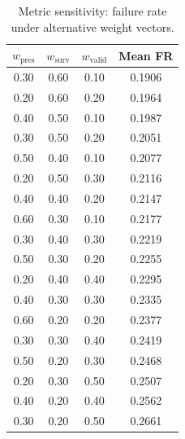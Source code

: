 \begin{table}[t]
\centering
\caption{Metric sensitivity: failure rate under alternative weight vectors.}
\label{tab:metric_sensitivity}
\begin{tabular}{cccc}
\toprule
$w_{\mathrm{pres}}$ & $w_{\mathrm{surv}}$ & $w_{\mathrm{valid}}$ & Mean FR \\
\midrule
0.30 & 0.60 & 0.10 & 0.1906 \\
0.20 & 0.60 & 0.20 & 0.1964 \\
0.40 & 0.50 & 0.10 & 0.1987 \\
0.30 & 0.50 & 0.20 & 0.2051 \\
0.50 & 0.40 & 0.10 & 0.2077 \\
0.20 & 0.50 & 0.30 & 0.2116 \\
0.40 & 0.40 & 0.20 & 0.2147 \\
0.60 & 0.30 & 0.10 & 0.2177 \\
0.30 & 0.40 & 0.30 & 0.2219 \\
0.50 & 0.30 & 0.20 & 0.2255 \\
0.20 & 0.40 & 0.40 & 0.2295 \\
0.40 & 0.30 & 0.30 & 0.2335 \\
0.60 & 0.20 & 0.20 & 0.2377 \\
0.30 & 0.30 & 0.40 & 0.2419 \\
0.50 & 0.20 & 0.30 & 0.2468 \\
0.20 & 0.30 & 0.50 & 0.2507 \\
0.40 & 0.20 & 0.40 & 0.2562 \\
0.30 & 0.20 & 0.50 & 0.2661 \\
\bottomrule
\end{tabular}
\end{table}